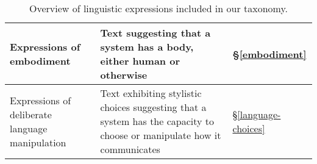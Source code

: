 \begin{table*}[ht]
\begin{tabular}{@{}p{4.1cm}|p{12.5cm}p{0.6cm}}
    Expressions of embodiment 
    & Text suggesting that a system has a body, either human or otherwise
    & \S\ref{embodiment}
    \\ \hline
    
    Expressions of deliberate language manipulation 
    & Text exhibiting stylistic choices suggesting that a system has the capacity to choose or manipulate how it communicates
    & \S\ref{language-choices}
    \\ \bottomrule
    
    \end{tabular}
\caption{Overview of linguistic expressions included in our taxonomy.}
\label{expressions}
\end{table*}